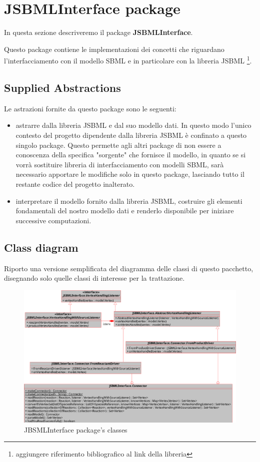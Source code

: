 
\section{JSBMLInterface package}

In questa sezione descriveremo il package \textbf{JSBMLInterface}.

Questo package contiene le implementazioni dei concetti che riguardano
l'interfacciamento con il modello SBML e in particolare con la
libreria JSBML \footnote{aggiungere riferimento bibliografico al link
  della libreria}. 

\subsection{Supplied Abstractions}

Le astrazioni fornite da questo package sono le seguenti:
\begin{itemize}
\item astrarre dalla libreria JSBML e dal suo modello dati. In questo
  modo l'unico contesto del progetto dipendente dalla libreria JSBML
  \`e confinato a questo singolo package. Questo permette agli altri
  package di non essere a conoscenza della specifica "sorgente" che
  fornisce il modello, in quanto se si vorr\`a sostituire libreria di
  interfacciamento con modelli SBML, sar\`a necessario apportare le
  modifiche solo in questo package, lasciando tutto il restante codice
  del progetto inalterato.
\item interpretare il modello fornito dalla libreria JSBML, costruire
  gli elementi fondamentali del nostro modello dati e renderlo
  disponibile per iniziare successive computazioni.
\end{itemize}

\subsection{Class diagram}

Riporto una versione semplificata del diagramma delle classi di questo
pacchetto, disegnando solo quelle classi di interesse per la
trattazione.
\begin{figure}
  \centering
  \includegraphics[angle=90]{packages/JSBMLInterface-class-diagram.eps}
  \caption{JBSMLInterface package's classes}
  \label{fig:JSBMLInterface-ClassDiagram}
\end{figure}

